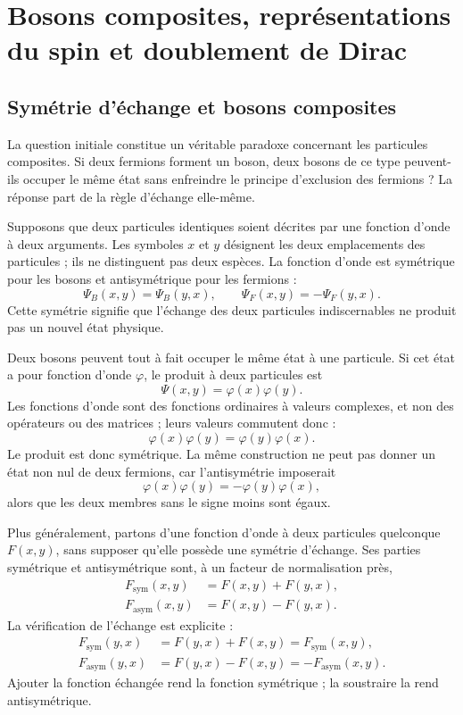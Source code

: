 \chapter{Bosons composites, représentations du spin et doublement de Dirac}

\section{Symétrie d’échange et bosons composites}

La question initiale constitue un véritable paradoxe concernant les particules composites. Si deux fermions forment un boson, deux bosons de ce type peuvent-ils occuper le même état sans enfreindre le principe d’exclusion des fermions ? La réponse part de la règle d’échange elle-même.

Supposons que deux particules identiques soient décrites par une fonction d’onde à deux arguments. Les symboles \(x\) et \(y\) désignent les deux emplacements des particules ; ils ne distinguent pas deux espèces. La fonction d’onde est symétrique pour les bosons et antisymétrique pour les fermions :
\begin{equation}
\Psi_B(x,y)=\Psi_B(y,x),
\qquad
\Psi_F(x,y)=-\Psi_F(y,x).
\end{equation}
Cette symétrie signifie que l’échange des deux particules indiscernables ne produit pas un nouvel état physique.

Deux bosons peuvent tout à fait occuper le même état à une particule. Si cet état a pour fonction d’onde \(\varphi\), le produit à deux particules est
\begin{equation}
\Psi(x,y)=\varphi(x)\varphi(y).
\end{equation}
Les fonctions d’onde sont des fonctions ordinaires à valeurs complexes, et non des opérateurs ou des matrices ; leurs valeurs commutent donc :
\begin{equation}
\varphi(x)\varphi(y)=\varphi(y)\varphi(x).
\end{equation}
Le produit est donc symétrique. La même construction ne peut pas donner un état non nul de deux fermions, car l’antisymétrie imposerait
\begin{equation}
\varphi(x)\varphi(y)=-\varphi(y)\varphi(x),
\end{equation}
alors que les deux membres sans le signe moins sont égaux.

Plus généralement, partons d’une fonction d’onde à deux particules quelconque \(F(x,y)\), sans supposer qu’elle possède une symétrie d’échange. Ses parties symétrique et antisymétrique sont, à un facteur de normalisation près,
\begin{align}
F_{\mathrm{sym}}(x,y)&=F(x,y)+F(y,x),\\
F_{\mathrm{asym}}(x,y)&=F(x,y)-F(y,x).
\end{align}
La vérification de l’échange est explicite :
\begin{align}
F_{\mathrm{sym}}(y,x)
&=F(y,x)+F(x,y)
=F_{\mathrm{sym}}(x,y),\\
F_{\mathrm{asym}}(y,x)
&=F(y,x)-F(x,y)
=-F_{\mathrm{asym}}(x,y).
\end{align}
Ajouter la fonction échangée rend la fonction symétrique ; la soustraire la rend antisymétrique.

